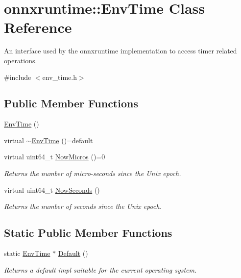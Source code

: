 \hypertarget{classonnxruntime_1_1EnvTime}{}\section{onnxruntime\+:\+:Env\+Time Class Reference}
\label{classonnxruntime_1_1EnvTime}


An interface used by the onnxruntime implementation to access timer related operations.  




{\ttfamily \#include $<$env\+\_\+time.\+h$>$}

\subsection*{Public Member Functions}
\begin{DoxyCompactItemize}
\item 
\mbox{\hyperlink{classonnxruntime_1_1EnvTime_a394e559d985427cc8abbf94523715769}{Env\+Time}} ()
\item 
virtual \mbox{\hyperlink{classonnxruntime_1_1EnvTime_a8d8335a02d598df1f03843e9b6503500}{$\sim$\+Env\+Time}} ()=default
\item 
virtual uint64\+\_\+t \mbox{\hyperlink{classonnxruntime_1_1EnvTime_a1041208f7cb0ba8afaaa3d354e0a6e63}{Now\+Micros}} ()=0
\begin{DoxyCompactList}\small\item\em Returns the number of micro-\/seconds since the Unix epoch. \end{DoxyCompactList}\item 
virtual uint64\+\_\+t \mbox{\hyperlink{classonnxruntime_1_1EnvTime_a1c0c2e072d0afbf63f64729c2cb764df}{Now\+Seconds}} ()
\begin{DoxyCompactList}\small\item\em Returns the number of seconds since the Unix epoch. \end{DoxyCompactList}\end{DoxyCompactItemize}
\subsection*{Static Public Member Functions}
\begin{DoxyCompactItemize}
\item 
static \mbox{\hyperlink{classonnxruntime_1_1EnvTime}{Env\+Time}} $\ast$ \mbox{\hyperlink{classonnxruntime_1_1EnvTime_a44c73be1935c14769fc2879f9618cebf}{Default}} ()
\begin{DoxyCompactList}\small\item\em Returns a default impl suitable for the current operating system. \end{DoxyCompactList}\end{DoxyCompactItemize}


